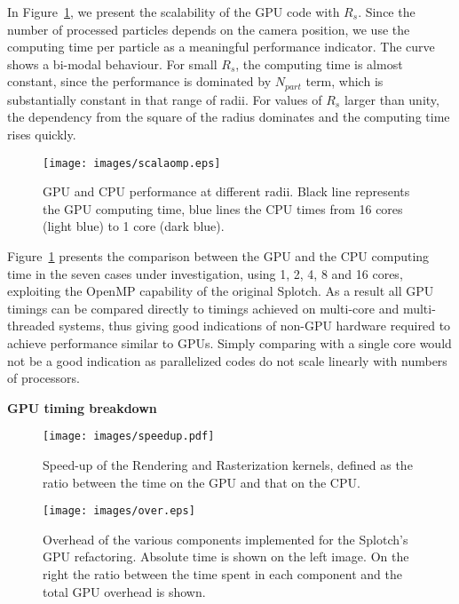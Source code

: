 \documentclass[11pt]{article}
\begin{document}
In Figure~\ref{fig:gpucpu}, we present the scalability of the GPU code 
with $R_s$. Since the number of processed particles depends on
the camera position, we use the  
computing time per particle as a meaningful performance
indicator. The curve shows a bi-modal behaviour. For small $R_s$,
the computing time is almost constant, since the performance is dominated
by $N_{part}$ term, which is substantially constant in that range of 
radii. For values of $R_s$ larger 
than unity, the dependency from the square of the radius dominates and the computing time 
rises quickly. 

\begin{figure}
\centering
\texttt{[image: images/scalaomp.eps]}
\caption{GPU and CPU performance at different radii. Black line represents the GPU 
computing time, blue lines the CPU times from 16 cores (light blue) to 1 core
(dark blue).}
\label{fig:gpucpu}
\end{figure}

Figure~\ref{fig:gpucpu} presents the comparison between the GPU and the CPU computing time
in the seven cases under investigation, using 
1, 2, 4, 8 and 16 cores, exploiting 
the OpenMP \cite{openmpurl} capability of the original Splotch. As a result all GPU timings can be compared directly to
timings achieved on multi-core and multi-threaded systems, thus giving good indications of non-GPU 
hardware required to achieve performance similar to GPUs. Simply comparing with a single core would not 
be a good indication as parallelized codes do not scale linearly with numbers of processors.

\medskip
\noindent
{\bf GPU timing breakdown}

\begin{figure}
\centering
\texttt{[image: images/speedup.pdf]}
\caption{
Speed-up of the Rendering and Rasterization kernels, defined as the ratio
between the time on the GPU and that on the CPU.
}
\label{fig:speedup}
\end{figure}

\begin{figure}
\centering
\texttt{[image: images/over.eps]}
\caption{Overhead of the various components implemented for the Splotch's
GPU refactoring. Absolute time is shown on the left image. On the right
the ratio between the time spent in each component and the total GPU 
overhead is shown.}
\label{fig:over}
\end{figure}
\end{document}
